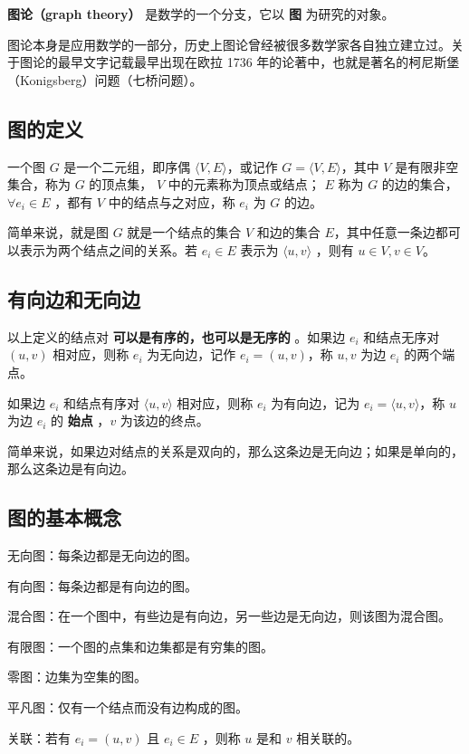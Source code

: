 
\textbf{图论（graph theory）} 是数学的一个分支，它以 \textbf{图} 为研究的对象。

图论本身是应用数学的一部分，历史上图论曾经被很多数学家各自独立建立过。关于图论的最早文字记载最早出现在欧拉 1736 年的论著中，也就是著名的柯尼斯堡（Konigsberg）问题（七桥问题）。

\subsection{图的定义}

一个图 $G$ 是一个二元组，即序偶 $\langle V,E\rangle$，或记作 $G= \langle V,E\rangle$，其中 $V$ 是有限非空集合，称为 $G$ 的顶点集， $V$ 中的元素称为顶点或结点； $E$ 称为 $G$ 的边的集合， $\forall e_i \in E$ ，都有 $V$ 中的结点与之对应，称 $e_i$ 为 $G$ 的边。

简单来说，就是图 $G$ 就是一个结点的集合 $V$ 和边的集合 $E$，其中任意一条边都可以表示为两个结点之间的关系。若 $e_i\in E$ 表示为 $\langle u,v\rangle$ ，则有 $u\in V , v\in V$。

\subsection{有向边和无向边}

以上定义的结点对 \textbf{可以是有序的，也可以是无序的} 。如果边 $e_i$ 和结点无序对 $(u,v)$ 相对应，则称 $e_i$ 为无向边，记作 $e_i=(u,v)$，称 $u,v$ 为边 $e_i$ 的两个端点。

如果边 $e_i$ 和结点有序对 $\langle u,v\rangle$ 相对应，则称 $e_i$ 为有向边，记为 $e_i= \langle u,v\rangle$，称 $u$ 为边 $e_i$ 的 \textbf{始点} ，$v$ 为该边的终点。

简单来说，如果边对结点的关系是双向的，那么这条边是无向边；如果是单向的，那么这条边是有向边。

\subsection{图的基本概念}

无向图：每条边都是无向边的图。

有向图：每条边都是有向边的图。

混合图：在一个图中，有些边是有向边，另一些边是无向边，则该图为混合图。

有限图：一个图的点集和边集都是有穷集的图。

零图：边集为空集的图。

平凡图：仅有一个结点而没有边构成的图。

关联：若有 $e_i=(u,v)$ 且 $e_i\in E$ ，则称 $u$ 是和 $v$ 相关联的。

